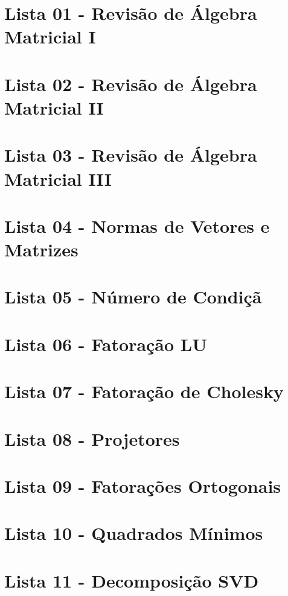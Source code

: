 \documentclass[a4paper,12pt, leqno, answers]{exam}
\begin{document}
\thispagestyle{empty}

\newpage
\setcounter{page}{1}
\tableofcontents
\newpage
\section{Lista 01 - Revis\~{a}o de \'{A}lgebra Matricial I}

\newpage
\section{Lista 02 - Revis\~{a}o de \'{A}lgebra Matricial II}

\newpage
\section{Lista 03 - Revis\~{a}o de \'{A}lgebra Matricial III}

\section{Lista 04 - Normas de Vetores e Matrizes}

\newpage
\section{Lista 05 - N\'{u}mero de Condi\c{c}\~{a}}

\newpage
\section{Lista 06 - Fatora\c{c}\~{a}o LU}

\newpage
\section{Lista 07 - Fatora\c{c}\~{a}o de Cholesky}

\newpage
\section{Lista 08 - Projetores}

\newpage
\section{Lista 09 - Fatora\c{c}\~{o}es Ortogonais}

\newpage
\section{Lista 10 - Quadrados Mínimos}

\newpage
\section{Lista 11 - Decomposi\c{c}\~{a}o SVD}

\newpage
\end{document}
